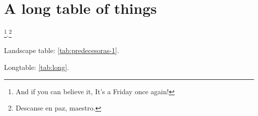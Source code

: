 % 
% 
% 




\chapter{A long table of things}

\lipsum[90-93] \footnote{And if you can believe it, It's a Friday once again!}.\footnote{Descanse en paz, maestro.} 

Landscape table: \autoref{tab:predecesoras-1}. 

Longtable: \autoref{tab:long}. 

